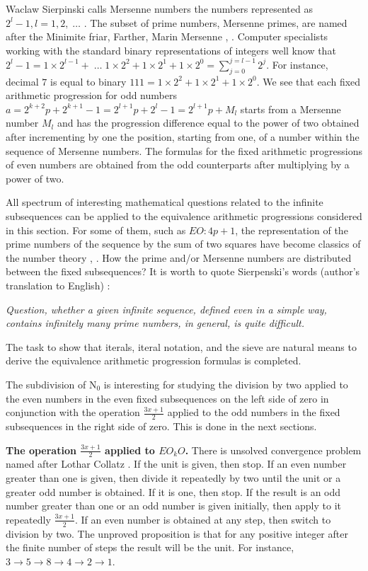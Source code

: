 \documentclass{article}
\begin{document}
Waclaw Sierpinski calls Mersenne numbers the numbers represented as $2^l - 1, l = 1, 2, \; \ldots$ \cite[p. 76-79]{sierpinski}. The subset of prime numbers, Mersenne primes, are named after the Minimite friar, Farther, Marin Mersenne \cite[p. 334, 385]{boyer}, \cite[p. 11, 22]{goldman}. Computer specialists working with the standard binary representations of integers well know that $2^l - 1 = 1 \times 2^{l-1} + \; \ldots \; 1 \times 2^2 + 1 \times 2^1 + 1 \times 2^0 = \sum_{j = 0}^{j = l -1}2^j$. For instance, decimal $7$ is equal to binary $111 = 1 \times 2^2 + 1 \times 2^1 + 1 \times 2^0$. We see that each fixed arithmetic progression for odd numbers $a = 2^{k+2}p+2^{k+1}-1 = 2^{l+1}p + 2^l - 1 = 2^{l+1}p + M_l$ starts from a Mersenne number $M_l$ and has the progression difference equal to the power of two obtained after incrementing by one the position, starting from one, of a number within the sequence of Mersenne numbers. The formulas for the fixed arithmetic progressions of even numbers are obtained from the odd counterparts after multiplying by a power of two.

All spectrum of interesting mathematical questions related to the infinite subsequences can be applied to the equivalence arithmetic progressions considered in this section. For some of them, such as $EO : 4p + 1$, the representation of the prime numbers of the sequence by the sum of two squares have become classics of the number theory \cite[p. 51-53]{sierpinski}, \cite[p. 20]{goldman}. How the prime and/or Mersenne numbers are distributed between the fixed subsequences? It is worth to quote Sierpenski's words (author's translation to English) \cite[p. 80]{sierpinski}:

\textit{Question, whether a given infinite sequence, defined even in a simple way, contains infinitely many prime numbers, in general, is quite difficult.}

The task to show that iterals, iteral notation, and the sieve are natural means to derive the equivalence arithmetic progression formulas is completed.

The subdivision of $\mathrm{N}_0$ is interesting for studying the division by two applied to the even numbers in the even fixed subsequences on the left side of zero in conjunction with the operation $\frac{3x + 1}{2}$ applied to the odd numbers in the fixed subsequences in the right side of zero. This is done in the next sections.

\textbf{The operation $\frac{3x + 1}{2}$ applied to $EO_k{O}$.} There is unsolved convergence problem named after Lothar Collatz \cite{lagarias}. If the unit is given, then stop. If an even number greater than one is given, then divide it repeatedly by two until the unit or a greater odd number is obtained. If it is one, then stop. If the result is an odd number greater than one or an odd number is given initially, then apply to it repeatedly $\frac{3x + 1}{2}$. If an even number is obtained at any step, then switch to division by two. The unproved proposition is that for any positive  integer after the finite number of steps the result will be the unit. For instance, $3 \to 5 \to 8 \to 4 \to 2 \to 1$.
\end{document}
